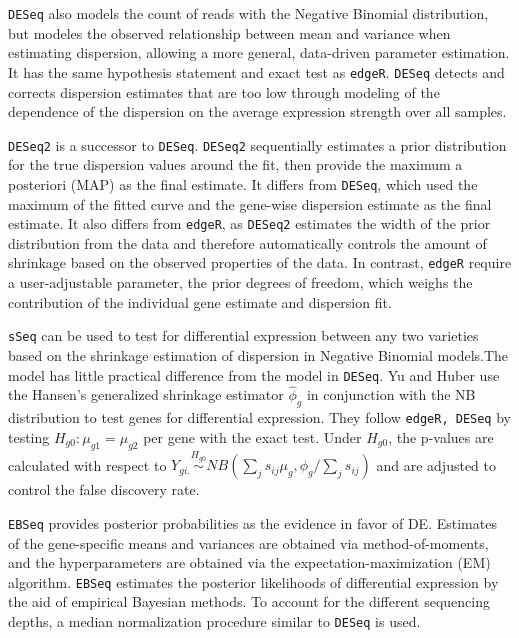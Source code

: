 {\tt DESeq} also models the count of reads with the Negative Binomial distribution, but modeles the observed relationship between mean and variance when estimating dispersion, allowing a more general, data-driven parameter estimation\citep{seyednasrollah2013comparison}. It has the same hypothesis statement and exact test as {\tt edgeR}. {\tt DESeq} detects and corrects dispersion estimates that are too low through modeling of the dependence of the dispersion on the average expression strength over all samples. 

{\tt DESeq2} is a successor to {\tt DESeq}. {\tt DESeq2} sequentially estimates a prior distribution for the true dispersion values around the fit, then provide the maximum a posteriori (MAP) as the final estimate. It differs from {\tt DESeq}, which used the maximum of the fitted curve and the gene-wise dispersion estimate as the final estimate. It also differs from {\tt edgeR}, as {\tt DESeq2} estimates the width of the prior distribution from the data and therefore automatically controls the amount of shrinkage based on the observed properties of the data. In contrast, {\tt edgeR} require a user-adjustable parameter, the prior degrees of freedom, which weighs the contribution of the individual gene estimate and dispersion fit\citep{love2014moderated}. 


{\tt sSeq} can be used to test for differential expression between any two varieties based on the shrinkage estimation of dispersion in Negative Binomial models\citep{yu2013sseq}.The model has little practical difference from the model in {\tt DESeq}. Yu and Huber use the Hansen's generalized shrinkage estimator $\hat{\phi}_g$ in conjunction with the NB distribution to test genes for differential expression. They follow {\tt edgeR, DESeq} by testing $H_{g0}: \mu_{g1} = \mu_{g2}$ per gene with the exact test. Under $H_{g0}$, the p-values are calculated with respect to $Y_{gi.} \stackrel{H_{g0}}{\sim} NB(\sum_{j} s_{ij}\mu_{g}, \phi_{g}/\sum_{j} s_{ij})$ and are adjusted to control the false discovery rate\citep{yu2013sseq}. 

{\tt EBSeq} provides posterior probabilities as the evidence in favor of DE. Estimates of the gene-specific means and variances are obtained via method-of-moments, and the hyperparameters are obtained via the expectation-maximization (EM) algorithm\citep{leng2013ebseq}. {\tt EBSeq} estimates the posterior likelihoods of differential expression by the aid of empirical Bayesian methods. To account for the different sequencing depths, a median normalization procedure similar to {\tt DESeq} is used. 